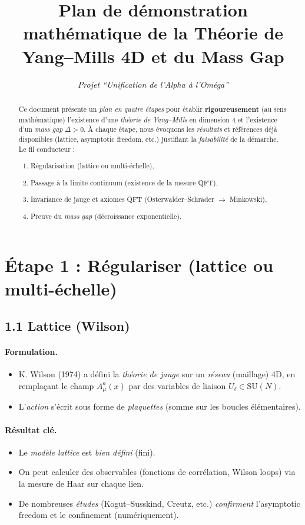 \documentclass[11pt]{article}
\title{\textbf{Plan de démonstration mathématique de la Théorie de Yang--Mills 4D et du Mass Gap}}
\author{\textit{Projet “Unification de l’Alpha à l’Oméga”}}
\date{}
\begin{document}
\maketitle

\begin{abstract}
Ce document présente un \emph{plan en quatre étapes} pour établir \textbf{rigoureusement} (au sens mathématique) l'existence d'une \emph{théorie de Yang--Mills} en dimension 4 et l'existence d'un \emph{mass gap} \(\Delta > 0\). À chaque étape, nous évoquons les \emph{résultats} et références déjà disponibles (lattice, asymptotic freedom, etc.) justifiant la \emph{faisabilité} de la démarche. Le fil conducteur :

\begin{enumerate}
  \item Régularisation (lattice ou multi-échelle),
  \item Passage à la limite continuum (existence de la mesure QFT),
  \item Invariance de jauge et axiomes QFT (Osterwalder--Schrader \(\rightarrow\) Minkowski),
  \item Preuve du \emph{mass gap} (décroissance exponentielle).
\end{enumerate}
\end{abstract}

\section*{Étape 1 : Régulariser (lattice ou multi-échelle)}

\subsection*{1.1 Lattice (Wilson)}

\paragraph{Formulation.}
\begin{itemize}
  \item K. Wilson (1974) a défini la \emph{théorie de jauge} sur un \emph{réseau} (maillage) 4D, en remplaçant le champ $A_\mu^a(x)$ par des variables de liaison $U_{\ell}\in \mathrm{SU}(N)$.
  \item L'\emph{action} s'écrit sous forme de \emph{plaquettes} (somme sur les boucles élémentaires).
\end{itemize}

\paragraph{Résultat clé.}
\begin{itemize}
  \item Le \emph{modèle lattice} est \emph{bien défini} (fini).
  \item On peut calculer des observables (fonctions de corrélation, Wilson loops) via la mesure de Haar sur chaque lien.
  \item De nombreuses \emph{études} (Kogut--Susskind, Creutz, etc.) \emph{confirment} l'asymptotic freedom et le confinement (numériquement).
\end{itemize}
\end{document}
